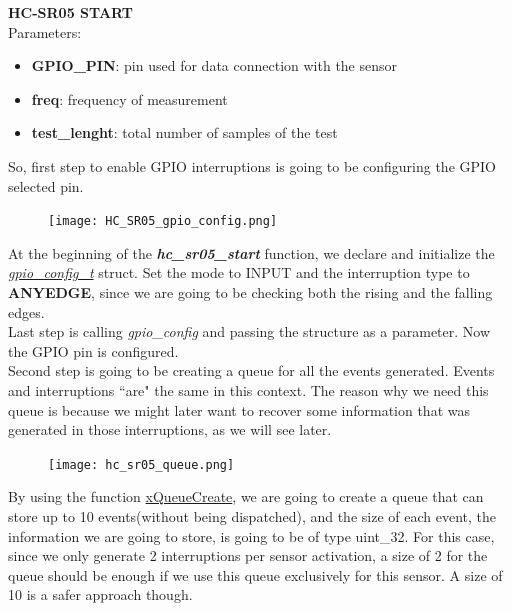 \documentclass[14pt]{article}
\begin{document}
\begin{normalsize}
		
		
		\noindent\large \textbf{HC-SR05 START}\normalsize\\
		Parameters:
		\begin{itemize}
			\item \textbf{GPIO\_PIN}: pin used for data connection with the sensor
			\item \textbf{freq}: frequency of measurement
			\item \textbf{test\_lenght}: total number of samples of the test
		\end{itemize}
		
		So, first step to enable GPIO interruptions is going to be configuring the GPIO selected pin.\vspace{-7pt}\\
		\setlength{\intextsep}{-12pt}
		\begin{figure}
			\begin{center}
				\texttt{[image: HC\_SR05\_gpio\_config.png]}
			\end{center}
		\end{figure}
		At the beginning of the \textit{\textbf{hc\_sr05\_start}} function, we declare and initialize the \href{https://docs.espressif.com/projects/esp-idf/en/stable/esp32/api-reference/peripherals/gpio.html#_CPPv413gpio_config_t}{\textit{gpio\_config\_t}} struct. Set the mode to INPUT and the interruption type to \textbf{ANYEDGE}, since we are going to be checking both the rising and the falling edges.\\
		
		\noindent Last step is calling \textit{gpio\_config} and passing the structure as a parameter. Now the GPIO pin is configured.\\
		\newpage
		Second step is going to be creating a queue for all the events generated. Events and interruptions ``are" the same in this context. The reason why we need this queue is because we might later want to recover some information that was generated in those interruptions, as we will see later.\vspace{-10pt}\\
		\setlength{\intextsep}{-10pt}
		\begin{figure}
			\begin{center}
				\texttt{[image: hc\_sr05\_queue.png]}
			\end{center}
		\end{figure}
		\noindent By using the function \href{https://www.freertos.org/Documentation/02-Kernel/04-API-references/06-Queues/01-xQueueCreate}{xQueueCreate}, we are going to create a queue that can store up to 10 events(without being dispatched), and the size of each event, the information we are going to store, is going to be of type uint\_32. For this case, since we only generate 2 interruptions per sensor activation, a size of 2 for the queue should be enough if we use this queue exclusively for this sensor. A size of 10 is a safer approach though.\\
		

\end{normalsize}
\end{document}

